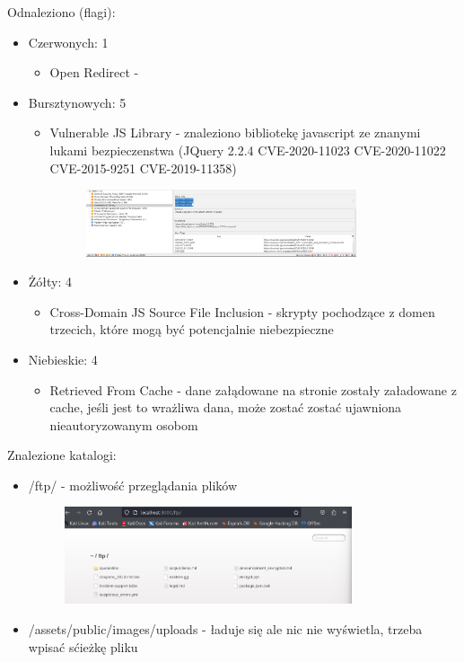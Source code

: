 \documentclass{article}
\begin{document}
Odnaleziono (flagi):
\begin{itemize}
    \item Czerwonych: 1
          \begin{itemize}
              \item Open Redirect -
          \end{itemize}
    \item Bursztynowych: 5
          \begin{itemize}
              \item Vulnerable JS Library - znaleziono bibliotekę javascript ze znanymi lukami bezpieczenstwa (JQuery 2.2.4 CVE-2020-11023
                    CVE-2020-11022
                    CVE-2015-9251
                    CVE-2019-11358)
                    \begin{figure}[H]
                        \centering
                        \includegraphics[width=0.8\textwidth]{jquery.png}
                    \end{figure}
          \end{itemize}
    \item Żółty: 4
          \begin{itemize}
              \item Cross-Domain JS Source File Inclusion - skrypty pochodzące z domen trzecich, które mogą być potencjalnie niebezpieczne
          \end{itemize}
    \item Niebieskie: 4
          \begin{itemize}
              \item Retrieved From Cache - dane załądowane na stronie zostały załadowane z cache, jeśli jest to wrażliwa dana, może zostać zostać ujawniona nieautoryzowanym osobom
          \end{itemize}
\end{itemize}

Znalezione katalogi:
\begin{itemize}
    \item /ftp/ - możliwość przeglądania plików
          \begin{figure}[H]
              \centering
              \includegraphics[width=0.8\textwidth]{katalog_ftp.png}
          \end{figure}
    \item /assets/public/images/uploads - ładuje się ale nic nie wyświetla, trzeba wpisać sćieżkę pliku
\end{itemize}
\end{document}
